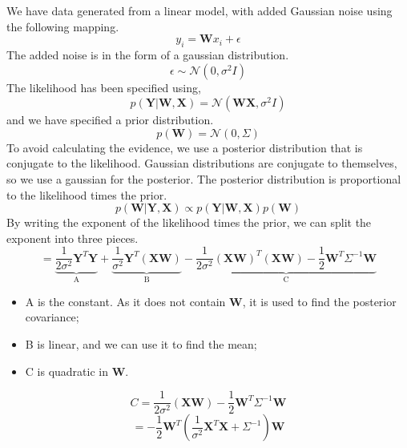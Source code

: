 \documentclass[10pt, a4paper, twocolumn]{article} %
\begin{document}
We have data generated from a linear model, with added Gaussian noise using the following mapping. 
\begin{equation*}
y_i = \mathbf{W}x_i + \epsilon
\end{equation*}
The added noise is in the form of a gaussian distribution.\\
\begin{equation*}
\epsilon \sim \mathcal{N}(0, \sigma^2 I)
\end{equation*}
The likelihood has been specified using,
\begin{equation*}
p(\mathbf{Y}|\mathbf{W},\mathbf{X}) = \mathcal{N}(\mathbf{W} \mathbf{X}, \sigma^2I)
\end{equation*}
and we have specified a prior distribution. 
\begin{equation*}
p(\mathbf{W}) = \mathcal{N}(0, \Sigma)
\end{equation*}
To avoid calculating the evidence, we use a posterior distribution that is conjugate to the likelihood. Gaussian distributions are conjugate to themselves, so we use a gaussian for the posterior. The posterior distribution is proportional to the likelihood times the prior. 
\begin{equation*}
p(\mathbf{W}|\mathbf{Y},\mathbf{X}) \propto p(\mathbf{Y}|\mathbf{W},\mathbf{X})p(\mathbf{W})
\end{equation*}
By writing the exponent of the likelihood times the prior, we can split the exponent into three pieces. 
\begin{equation}
= \underbrace{\frac{1}{2\sigma^2}\mathbf{Y}^{T}\mathbf{Y}}_\text{A} + \underbrace{\frac{1}{\sigma^{2}}\mathbf{Y}^{T}(\mathbf{XW})}_\text{B}-\underbrace{\frac{1}{2\sigma^2}(\mathbf{XW})^T(\mathbf{XW})-\frac{1}{2}\mathbf{W}^{T}\Sigma^{-1}\mathbf{W}}_\text{C}
\end{equation}
\begin{itemize}
\item A is the constant. As it does not contain $\mathbf{W}$, it is used to find the posterior covariance;
\item B is linear, and we can use it to find the mean;
\item C is quadratic in $\mathbf{W}$.
\end{itemize}
\begin{equation*}
C=\frac{1}{2\sigma^{2}}(\mathbf{XW})-\frac{1}{2}\mathbf{W}^{T}\Sigma^{-1}\mathbf{W}
\end{equation*}
\begin{equation*}
= -\frac{1}{2}\mathbf{W}^{T}(\frac{1}{\sigma^{2}}\mathbf{X}^{T}\mathbf{X} + \Sigma^{-1})\mathbf{W}
\end{equation*}
\end{document}
